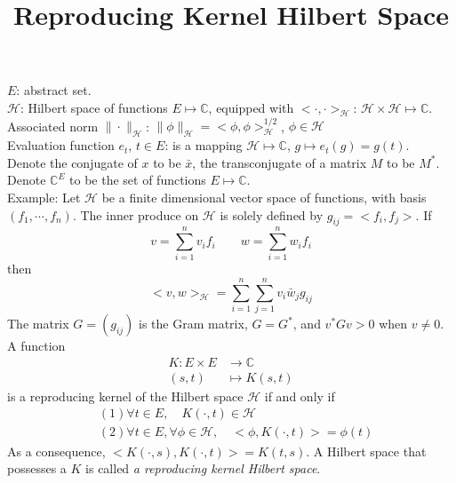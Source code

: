 \documentclass[a4paper,onecolumn]{article}
\begin{document}
\setcounter{page}{1}

\title{Reproducing Kernel Hilbert Space}
\date{}
\author{}
\maketitle
\noindent $E$: abstract set.\\

\noindent $\mathcal{H}$: Hilbert space of functions $E\mapsto \mathbb{C}$, equipped with
$<\cdot,\cdot>_\mathcal{H}$: $\mathcal{H}\times\mathcal{H}\mapsto\mathbb{C}$.
Associated norm $\|\cdot\|_\mathcal{H}$: $\|\phi\|_\mathcal{H} = <\phi,\phi>_\mathcal{H}^{1/2}$, $\phi \in \mathcal{H}$\\

\noindent Evaluation function $e_t$, $t\in E$: is a mapping
$\mathcal{H}\mapsto\mathbb{C}$, $g\mapsto e_t(g) = g(t)$.\\

\noindent Denote the conjugate of $x$ to be $\bar{x}$, the transconjugate of a matrix $M$ to be $M^*$.\\

\noindent Denote $\mathbb{C}^E$ to be the set of functions $E\mapsto \mathbb{C}$.\\

\noindent Example: Let $\mathcal{H}$ be a finite dimensional vector space of functions, with basis
$(f_1, \cdots, f_n)$. The inner produce on $\mathcal{H}$ is solely defined by 
$ g_{ij} = <f_i, f_j>$. If
$$
v = \sum_{i=1}^n v_i f_i\qquad w = \sum_{i=1}^n w_i f_i
$$
then
$$
<v,w>_\mathcal{H} = \sum_{i=1}^n\sum_{j=1}^n v_i \bar{w}_j g_{ij}
$$
The matrix $G = (g_{ij})$ is the Gram matrix, $G=G^*$, and $v^*Gv>0$ when $v\neq 0$.\\

\noindent A function
\begin{equation*}\begin{split}
    K: E\times E &\rightarrow \mathbb{C}\\
    (s,t) &\mapsto K(s,t)
\end{split}\end{equation*}
is a reproducing kernel of the Hilbert space $\mathcal{H}$ if and only if
\begin{equation*}\begin{split}
    &(1) \forall t\in E, \quad K(\cdot, t)\in \mathcal{H}\\
    &(2) \forall t\in E, \forall \phi \in \mathcal{H}, \quad <\phi, K(\cdot, t)> = \phi(t)
\end{split}\end{equation*}
As a consequence, $<K(\cdot, s), K(\cdot, t)> = K(t,s)$. A Hilbert space that possesses a $K$ is called
\emph{a reproducing kernel Hilbert space}.\\
\end{document}
